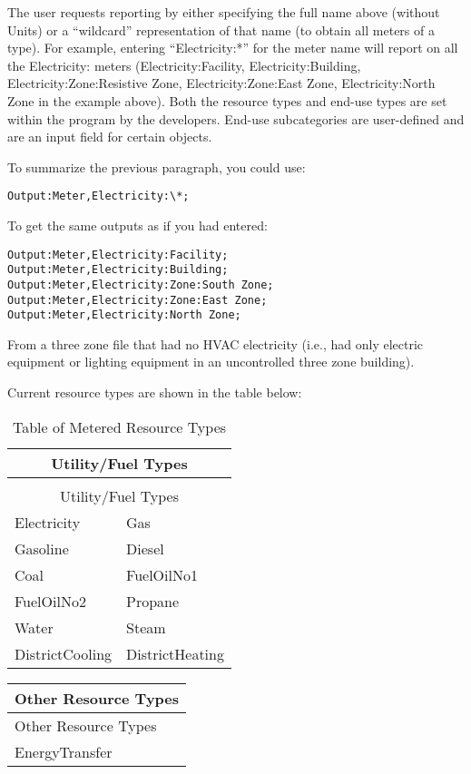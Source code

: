 The user requests reporting by either specifying the full name above (without Units) or a “wildcard” representation of that name (to obtain all meters of a type). For example, entering “Electricity:*” for the meter name will report on all the Electricity: meters (Electricity:Facility, Electricity:Building, Electricity:Zone:Resistive Zone, Electricity:Zone:East Zone, Electricity:North Zone in the example above). Both the resource types and end-use types are set within the program by the developers. End-use subcategories are user-defined and are an input field for certain objects.

To summarize the previous paragraph, you could use:

\begin{lstlisting}
Output:Meter,Electricity:\*;
\end{lstlisting}

To get the same outputs as if you had entered:

\begin{lstlisting}
Output:Meter,Electricity:Facility;
Output:Meter,Electricity:Building;
Output:Meter,Electricity:Zone:South Zone;
Output:Meter,Electricity:Zone:East Zone;
Output:Meter,Electricity:North Zone;
\end{lstlisting}

From a three zone file that had no HVAC electricity (i.e., had only electric equipment or lighting equipment in an uncontrolled three zone building).

Current resource types are shown in the table below:

\begin{longtable}[c]{@{}ll@{}}
\caption{Table of Metered Resource Types \label{table:table-of-metered-resource-types}} \tabularnewline
\toprule 
\multicolumn{2}{c}{Utility/Fuel Types} \tabularnewline
\midrule
\endfirsthead

\caption[]{Table of Metered Resource Types} \tabularnewline
\toprule 
\multicolumn{2}{c}{Utility/Fuel Types} \tabularnewline
\midrule
\endhead

Electricity & Gas \tabularnewline
Gasoline & Diesel \tabularnewline
Coal & FuelOilNo1 \tabularnewline
FuelOilNo2 & Propane \tabularnewline
Water & Steam \tabularnewline
DistrictCooling & DistrictHeating \tabularnewline
\bottomrule
\end{longtable}

\begin{longtable}[c]{@{}l@{}}
\toprule 
Other Resource Types \tabularnewline
\midrule
\endfirsthead

\toprule 
Other Resource Types \tabularnewline
\midrule
\endhead

EnergyTransfer \tabularnewline
\bottomrule
\end{longtable}


